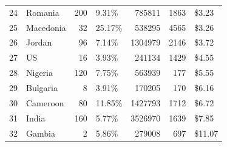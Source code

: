\documentclass[letterpaper,12pt]{article}
\theoremstyle{proposition}
\begin{document}
\begin{table}[t]
\begin{tabular}{llrlrrl}
24 & Romania & 200 & 9.31\% & 785811 & 1863 & \$3.23 \\
25 & Macedonia & 32 & 25.17\% & 538295 & 4565 & \$3.26 \\
26 & Jordan & 96 & 7.14\% & 1304979 & 2146 & \$3.72 \\
27 & US & 16 & 3.93\% & 241134 & 1429 & \$4.55 \\
28 & Nigeria & 120 & 7.75\% & 563939 & 177 & \$5.55 \\
29 & Bulgaria & 8 & 3.91\% & 170205 & 170 & \$6.16 \\
30 & Cameroon & 80 & 11.85\% & 1427793 & 1712 & \$6.72 \\
31 & India & 160 & 5.77\% & 3526970 & 1639 & \$7.85 \\
32 & Gambia & 2 & 5.86\% & 279008 & 697 & \$11.07 \\
\bottomrule
\end{tabular}
\end{table}
\end{document}
